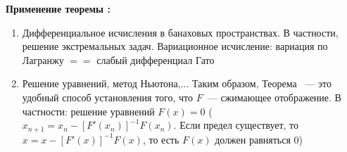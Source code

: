 \begin{unnecessary}
    \textbf{Применение теоремы :}
    \begin{enumerate}
        \item Дифференциальное исчисления в банаховых пространствах.
        В частности, решение экстремальных задач.
        Вариационное исчисление: вариация по Лагранжу $==$ слабый дифференциал Гато
    
        \item Решение уравнений, метод Ньютона,...
        Таким образом, Теорема ~--- это удобный способ установления того, что $F$~--- сжимающее отображение.
        В частности: решение уравнений $F(x)=0$ ($x_{n+1}=x_n-[F'(x_n)]^{-1} F(x_n)$. Если предел существует, то $x=x-[F'(x)]^{-1} F(x)$, то есть $F(x)$ должен равняться 0)
    \end{enumerate}
\end{unnecessary}


